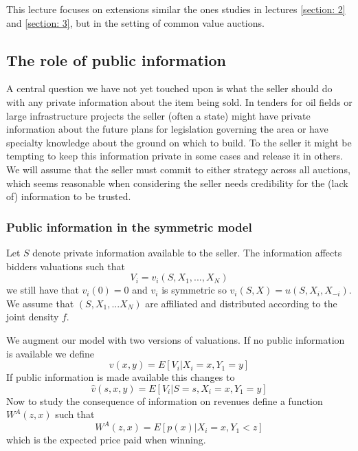 This lecture focuses on extensions similar the ones studies in lectures \ref{section: 2} and \ref{section: 3}, but in the setting of common value auctions. 

\subsection{The role of public information}
A central question we have not yet touched upon is what the seller should do with any private information about the item being sold. In tenders for oil fields or large infrastructure projects the seller (often a state) might have private information about the future plans for legislation governing the area or have specialty knowledge about the ground on which to build. To the seller it might be tempting to keep this information private in some cases and release it in others. We will assume that the seller must commit to either strategy across all auctions, which seems reasonable when considering the seller needs credibility for the (lack of) information to be trusted.

\subsubsection{Public information in the symmetric model} Let $S$ denote private information available to the seller. The information affects bidders valuations such that 
\begin{equation}
    V_i = v_i(S,X_1, ..., X_N)
\end{equation}
we still have that $v_i(0)=0$ and $v_i$ is symmetric so $v_i(S,X)=u(S,X_i, X_{-i})$. We assume that $(S, X_1, ...X_N)$ are affiliated and distributed according to the joint density $f$.

We augment our model with two versions of valuations. If no public information is available we define 
\begin{equation}
    v(x,y) = E[V_i |X_i = x, Y_1 = y]
\end{equation}
If public information is made available this changes to 
\begin{equation}
    \hat{v}(s,x,y) = E[V_i | S=s, X_i = x, Y_1 = y]
\end{equation}
Now to study the consequence of information on revenues define a function $W^A(z,x)$ such that 
\begin{equation}
    W^A(z,x) = E[p(x) | X_i = x, Y_1 < z]
\end{equation}
which is the expected price paid when winning. 

